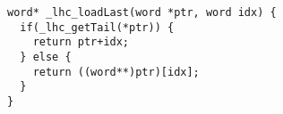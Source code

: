 \documentclass[a4paper,oneside]{memoir}
\begin{document}
\lstset{language=c}
\begin{lstlisting}
word* _lhc_loadLast(word *ptr, word idx) {
  if(_lhc_getTail(*ptr)) {
    return ptr+idx;
  } else {
    return ((word**)ptr)[idx];
  }
}
\end{lstlisting}

%
\end{document}
